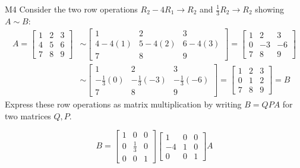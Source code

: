 \begin{problem}{M4}
Consider the two row operations 
\(R_2-4R_1\to R_2\) and \(\frac{1}{3}R_2\to R_2\)
showing \(A\sim B\):
\begin{align*}
A
  =
\begin{bmatrix}
1&2&3\\
4&5&6\\
7&8&9
\end{bmatrix}
  &\sim
\begin{bmatrix}
1&2&3\\
4-4(1)&5-4(2)&6-4(3)\\
7&8&9
\end{bmatrix}
  =
\begin{bmatrix}
1&2&3\\
0&-3&-6\\
7&8&9
\end{bmatrix}
  \\&\sim
\begin{bmatrix}
1&2&3\\
-\frac{1}{3}(0)&-\frac{1}{3}(-3)&-\frac{1}{3}(-6)\\
7&8&9
\end{bmatrix}
  =
\begin{bmatrix}
1&2&3\\
0&1&2\\
7&8&9
\end{bmatrix}
  = 
B
\end{align*}
Express these row operations as matrix multiplication
by writing \(B=QPA\) for two matrices \(Q,P\).
\end{problem}
\begin{solution}
\[
B
  =
\begin{bmatrix}
  1&0&0\\
  0&\frac{1}{3}&0\\
  0&0&1
\end{bmatrix}
\begin{bmatrix}
  1&0&0\\
  -4&1&0\\
  0&0&1
\end{bmatrix}
A
\]
\end{solution}


